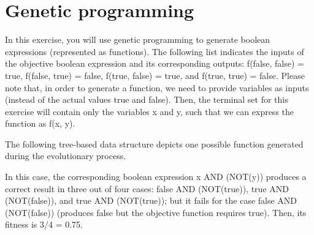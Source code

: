 \documentclass{article}
\begin{document}
\section{Genetic programming}
In this exercise, you will use genetic programming to generate boolean expressions (represented as functions). The following list indicates the inputs of the objective boolean expression and its corresponding outputs: f(false, false) = true, f(false, true) = false, f(true, false) = true, and f(true, true) = false. Please note that, in order to generate a function, we need to provide variables as inputs (instead of the actual values true and false). Then, the terminal set for this exercise will contain only the variables x and y, such that we can express the function as f(x, y).

The following tree-based data structure depicts one possible function generated during the evolutionary process.

In this case, the corresponding boolean expression x AND (NOT(y)) produces a correct result in three out of four cases: false AND (NOT(true)), true AND (NOT(false)), and true AND (NOT(true)); but it fails for the case false AND (NOT(false)) (produces false but the objective function requires true). Then, its fitness is 3/4 = 0.75.
\end{document}
